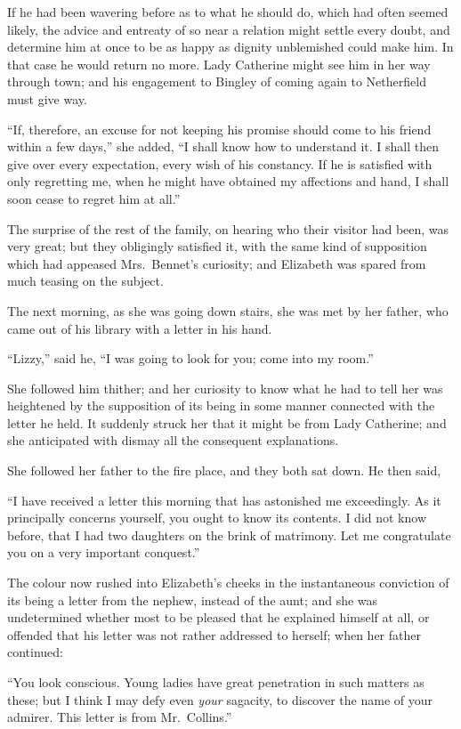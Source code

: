 \documentclass[12pt,english]{book}
\begin{document}
If he had been wavering before as to what he should do, which had
often seemed likely, the advice and entreaty of so near a relation
might settle every doubt, and determine him at once to be as happy
as dignity unblemished could make him. In that case he would return
no more. Lady Catherine might see him in her way through town; and
his engagement to Bingley of coming again to Netherfield must give
way.

{}``If, therefore, an excuse for not keeping his promise should come
to his friend within a few days,'' she added, {}``I shall know how
to understand it. I shall then give over every expectation, every
wish of his constancy. If he is satisfied with only regretting me,
when he might have obtained my affections and hand, I shall soon cease
to regret him at all.''

\bigskip{} The surprise of the rest of the family, on hearing who
their visitor had been, was very great; but they obligingly satisfied
it, with the same kind of supposition which had appeased Mrs.\ Bennet's
curiosity; and Elizabeth was spared from much teasing on the subject.

The next morning, as she was going down stairs, she was met by her
father, who came out of his library with a letter in his hand.

{}``Lizzy,'' said he, {}``I was going to look for you; come into
my room.''

She followed him thither; and her curiosity to know what he had to
tell her was heightened by the supposition of its being in some manner
connected with the letter he held. It suddenly struck her that it
might be from Lady Catherine; and she anticipated with dismay all
the consequent explanations.

She followed her father to the fire place, and they both sat down.
He then said,

{}``I have received a letter this morning that has astonished me
exceedingly. As it principally concerns yourself, you ought to know
its contents. I did not know before, that I had two daughters on the
brink of matrimony. Let me congratulate you on a very important conquest.''

The colour now rushed into Elizabeth's cheeks in the instantaneous
conviction of its being a letter from the nephew, instead of the aunt;
and she was undetermined whether most to be pleased that he explained
himself at all, or offended that his letter was not rather addressed
to herself; when her father continued:

{}``You look conscious. Young ladies have great penetration in such
matters as these; but I think I may defy even \textit{your} sagacity,
to discover the name of your admirer. This letter is from Mr.\ Collins.''
\end{document}
